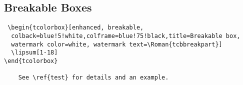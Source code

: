 \subsection{Breakable Boxes}

 \begin{verbatim}
 \begin{tcolorbox}[enhanced, breakable,
  colback=blue!5!white,colframe=blue!75!black,title=Breakable box,
  watermark color=white, watermark text=\Roman{tcbbreakpart}]
  \lipsum[1-18]
\end{tcolorbox}

	See \ref{test} for details and an example.
 \end{verbatim}
 
 
 

 